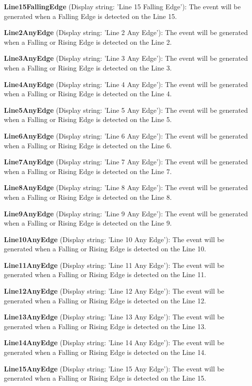 \begin{DoxyItemize}
\item {\bfseries Line15\+Falling\+Edge} (Display string\+: 'Line 15 Falling Edge')\+: The event will be generated when a Falling Edge is detected on the Line 15.
\item {\bfseries Line2\+Any\+Edge} (Display string\+: 'Line 2 Any Edge')\+: The event will be generated when a Falling or Rising Edge is detected on the Line 2.
\item {\bfseries Line3\+Any\+Edge} (Display string\+: 'Line 3 Any Edge')\+: The event will be generated when a Falling or Rising Edge is detected on the Line 3.
\item {\bfseries Line4\+Any\+Edge} (Display string\+: 'Line 4 Any Edge')\+: The event will be generated when a Falling or Rising Edge is detected on the Line 4.
\item {\bfseries Line5\+Any\+Edge} (Display string\+: 'Line 5 Any Edge')\+: The event will be generated when a Falling or Rising Edge is detected on the Line 5.
\item {\bfseries Line6\+Any\+Edge} (Display string\+: 'Line 6 Any Edge')\+: The event will be generated when a Falling or Rising Edge is detected on the Line 6.
\item {\bfseries Line7\+Any\+Edge} (Display string\+: 'Line 7 Any Edge')\+: The event will be generated when a Falling or Rising Edge is detected on the Line 7.
\item {\bfseries Line8\+Any\+Edge} (Display string\+: 'Line 8 Any Edge')\+: The event will be generated when a Falling or Rising Edge is detected on the Line 8.
\item {\bfseries Line9\+Any\+Edge} (Display string\+: 'Line 9 Any Edge')\+: The event will be generated when a Falling or Rising Edge is detected on the Line 9.
\item {\bfseries Line10\+Any\+Edge} (Display string\+: 'Line 10 Any Edge')\+: The event will be generated when a Falling or Rising Edge is detected on the Line 10.
\item {\bfseries Line11\+Any\+Edge} (Display string\+: 'Line 11 Any Edge')\+: The event will be generated when a Falling or Rising Edge is detected on the Line 11.
\item {\bfseries Line12\+Any\+Edge} (Display string\+: 'Line 12 Any Edge')\+: The event will be generated when a Falling or Rising Edge is detected on the Line 12.
\item {\bfseries Line13\+Any\+Edge} (Display string\+: 'Line 13 Any Edge')\+: The event will be generated when a Falling or Rising Edge is detected on the Line 13.
\item {\bfseries Line14\+Any\+Edge} (Display string\+: 'Line 14 Any Edge')\+: The event will be generated when a Falling or Rising Edge is detected on the Line 14.
\item {\bfseries Line15\+Any\+Edge} (Display string\+: 'Line 15 Any Edge')\+: The event will be generated when a Falling or Rising Edge is detected on the Line 15.
\end{DoxyItemize}

